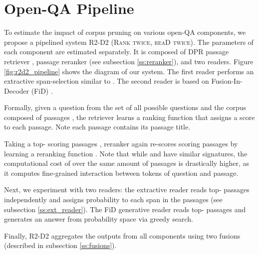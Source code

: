 \documentclass[11pt,a4paper]{article}
\begin{document}
\section{Open-QA Pipeline}

To estimate the impact of corpus pruning on various open-QA components, we propose a pipelined system R2-D2 (\textsc{Rank twice}, \textsc{reaD twice}).  The parameters of each component are estimated separately. It is composed of DPR passage retriever \cite{karpukhin2020dense}, passage reranker (see subsection \ref{ss:reranker}), and two readers. Figure \ref{fig:r2d2_pipeline} shows the diagram of our system. The first reader performs an extractive span-selection similar to \citet{fajcik2020rethinking}. The second reader is based on Fusion-In-Decoder (FiD) \cite{izacard2020leveraging}.


Formally, given a question  from the set of all possible questions   and the corpus  composed of passages , the retriever learns a ranking function  that assigns a score to each passage. Note each passage contains its passage title.

Taking a top- scoring passages , reranker again re-scores  scoring passages by learning a reranking function . Note that while  and  have similar signatures, the computational cost of  over the same amount of passages is drastically higher, as it computes fine-grained interaction between tokens of question and passage.


Next, we experiment with two readers: the extractive reader reads top- passages  independently and assigns probability  to each span  in the passages (see subsection \ref{ss:ext_reader}). 
The FiD generative reader reads top- passages  and generates an answer from probability space  via greedy search.

Finally, R2-D2 aggregates the outputs from all components using two fusions (described in subsection \ref{ss:fusions}).
\end{document}
